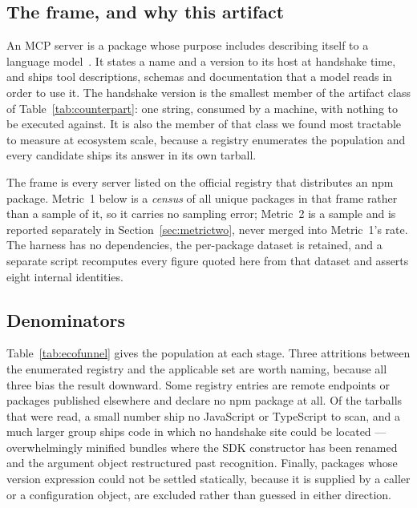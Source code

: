 \documentclass[10pt,journal,compsoc]{IEEEtran}
\begin{document}
\subsection{The frame, and why this artifact}

An MCP server is a package whose purpose includes describing itself to a language
model~\cite{anthropic2024mcp}. It states a name and a version to its host at handshake time,
and ships tool descriptions, schemas and documentation that a model reads in order to use it.
The handshake version is the smallest member of the artifact class of
Table~\ref{tab:counterpart}: one string, consumed by a machine, with nothing to be executed
against. It is also the member of that class we found most tractable to measure at ecosystem
scale, because a registry enumerates the population and every candidate ships its answer in
its own tarball.

The frame is every server listed on the official registry that distributes an npm package.
Metric~1 below is a \emph{census} of all \factEcoPackages{} unique packages in that frame
rather than a sample of it, so it carries no sampling error; Metric~2 is a sample and is
reported separately in Section~\ref{sec:metrictwo}, never merged into Metric~1's rate. The
harness has no dependencies, the per-package dataset is retained, and a separate script
recomputes every figure quoted here from that dataset and asserts eight internal identities.

\subsection{Denominators}

Table~\ref{tab:ecofunnel} gives the population at each stage. Three attritions between the
enumerated registry and the applicable set are worth naming, because all three bias the result
downward. Some registry entries are remote endpoints or packages published elsewhere and
declare no npm package at all. Of the tarballs that were read, a small number ship no
JavaScript or TypeScript to scan, and a much larger group ships code in which no handshake site
could be located --- overwhelmingly minified bundles where the SDK constructor has been renamed
and the argument object restructured past recognition. Finally, packages whose version
expression could not be settled statically, because it is supplied by a caller or a
configuration object, are excluded rather than guessed in either direction.
\end{document}
